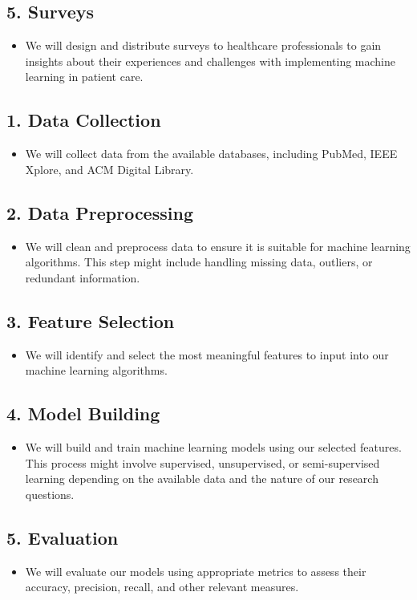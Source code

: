 \documentclass[conference]{IEEEtran}
\begin{document}
\subsection{5. Surveys}
\begin{itemize}
\item We will design and distribute surveys to healthcare professionals to gain insights about their experiences and challenges with implementing machine learning in patient care.
\end{itemize}
\subsection{1. Data Collection}
\begin{itemize}
\item We will collect data from the available databases, including PubMed, IEEE Xplore, and ACM Digital Library.
\end{itemize}
\subsection{2. Data Preprocessing}
\begin{itemize}
\item We will clean and preprocess data to ensure it is suitable for machine learning algorithms. This step might include handling missing data, outliers, or redundant information.
\end{itemize}
\subsection{3. Feature Selection}
\begin{itemize}
\item We will identify and select the most meaningful features to input into our machine learning algorithms.
\end{itemize}
\subsection{4. Model Building}
\begin{itemize}
\item We will build and train machine learning models using our selected features. This process might involve supervised, unsupervised, or semi-supervised learning depending on the available data and the nature of our research questions.
\end{itemize}
\subsection{5. Evaluation}
\begin{itemize}
\item We will evaluate our models using appropriate metrics to assess their accuracy, precision, recall, and other relevant measures.
\end{itemize}
\end{document}

